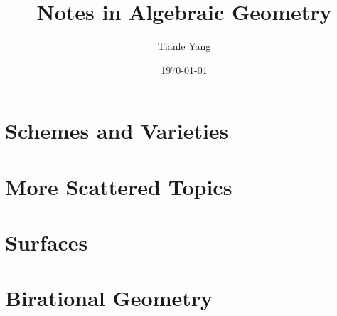 \documentclass[sectionlevel=book]{noteformyself}
\title{Notes in Algebraic Geometry}
\author{Tianle Yang}
\date{\today}
\begin{document}
    \maketitle

    \frontmatter

    \tableofcontents

    \mainmatter

    \chapter{Schemes and Varieties}
        \setcounter{section}{-1}
        
        
        
        
        
        

    \chapter{More Scattered Topics}

    \chapter{Surfaces}
        
        
        
        
        
        
        


    \chapter{Birational Geometry}
        
        
        
\end{document}
